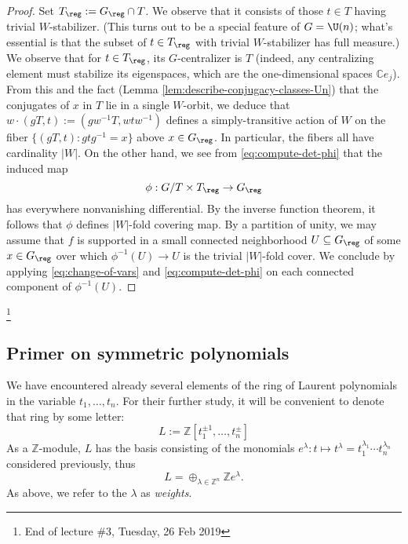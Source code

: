 \documentclass[reqno]{amsart} 
\begin{document}
\begin{proof}
  Set $T_{\reg} := G_{\reg} \cap T$.  We observe that it consists of those $t \in T$ having trivial $W$-stabilizer.  (This turns out to be a special feature of $G = \U(n)$; what's essential is that the subset of $t \in T_{\reg}$ with trivial $W$-stabilizer has full measure.)  We observe that for $t \in T_{\reg}$, its $G$-centralizer is $T$ (indeed, any centralizing element must stabilize its eigenspaces, which are the one-dimensional spaces $\mathbb{C} e_j$).  From this and the fact (Lemma \ref{lem:describe-conjugacy-classes-Un}) that the conjugates of $x$ in $T$ lie in a single $W$-orbit, we deduce that $w \cdot (g T, t) := (g w^{-1} T, w t w^{-1})$ defines a simply-transitive action of $W$ on the fiber $\{(g T, t) : g t g^{-1} = x\}$ above $x \in G_{\reg}$.  In particular, the fibers all have cardinality $|W|$.  On the other hand, we see from \eqref{eq:compute-det-phi} that the induced map
  \begin{equation*}
    \phi : G/T \times T_{\reg} \rightarrow G_{\reg}
  \end{equation*}
  has everywhere nonvanishing differential.  By the inverse function theorem, it follows that $\phi$ defines $|W|$-fold covering map.  By a partition of unity, we may assume that $f$ is supported in a small connected neighborhood $U \subseteq G_{\reg}$ of some $x \in G_{\reg}$ over which $\phi^{-1}(U) \rightarrow U$ is the trivial $|W|$-fold cover.  We conclude by applying \eqref{eq:change-of-vars} and \eqref{eq:compute-det-phi} on each connected component of $\phi^{-1}(U)$.
\end{proof}
\footnote{End of lecture \#3, Tuesday, 26 Feb 2019}

\subsection{Primer on symmetric polynomials}
We have encountered already several elements of the ring of Laurent polynomials in the variable $t_1,\dotsc,t_n$.  For their further study, it will be convenient to denote that ring by some letter:
\begin{equation*}
  L := \mathbb{Z}[t_1^{\pm 1},\dotsc,t_n^{\pm}]
\end{equation*}
As a $\mathbb{Z}$-module, $L$ has the basis consisting of the monomials $e^\lambda : t \mapsto t^{\lambda} = t_1^{\lambda_1} \dotsb t_n^{\lambda_n}$ considered previously, thus
\begin{equation*}
  L = \oplus_{\lambda \in \mathbb{Z}^n} \mathbb{Z} e^\lambda.
\end{equation*}
As above, we refer to the $\lambda$ as \emph{weights}.
\end{document}
